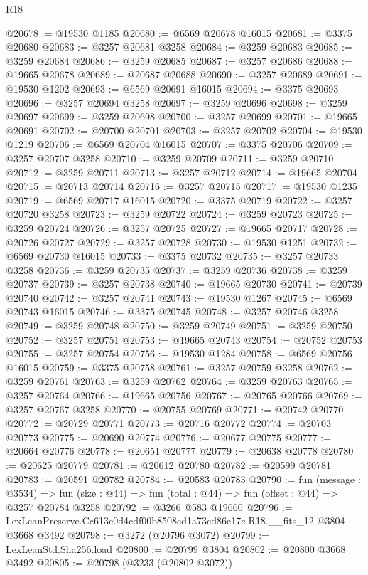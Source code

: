 \begin{lexlean}{R18}
\begin{coremodule}
@20678 := @19530 @1185
@20680 := @6569 @20678 @16015
@20681 := @3375 @20680
@20683 := @3257 @20681 @3258
@20684 := @3259 @20683
@20685 := @3259 @20684
@20686 := @3259 @20685
@20687 := @3257 @20686
@20688 := @19665 @20678
@20689 := @20687 @20688
@20690 := @3257 @20689
@20691 := @19530 @1202
@20693 := @6569 @20691 @16015
@20694 := @3375 @20693
@20696 := @3257 @20694 @3258
@20697 := @3259 @20696
@20698 := @3259 @20697
@20699 := @3259 @20698
@20700 := @3257 @20699
@20701 := @19665 @20691
@20702 := @20700 @20701
@20703 := @3257 @20702
@20704 := @19530 @1219
@20706 := @6569 @20704 @16015
@20707 := @3375 @20706
@20709 := @3257 @20707 @3258
@20710 := @3259 @20709
@20711 := @3259 @20710
@20712 := @3259 @20711
@20713 := @3257 @20712
@20714 := @19665 @20704
@20715 := @20713 @20714
@20716 := @3257 @20715
@20717 := @19530 @1235
@20719 := @6569 @20717 @16015
@20720 := @3375 @20719
@20722 := @3257 @20720 @3258
@20723 := @3259 @20722
@20724 := @3259 @20723
@20725 := @3259 @20724
@20726 := @3257 @20725
@20727 := @19665 @20717
@20728 := @20726 @20727
@20729 := @3257 @20728
@20730 := @19530 @1251
@20732 := @6569 @20730 @16015
@20733 := @3375 @20732
@20735 := @3257 @20733 @3258
@20736 := @3259 @20735
@20737 := @3259 @20736
@20738 := @3259 @20737
@20739 := @3257 @20738
@20740 := @19665 @20730
@20741 := @20739 @20740
@20742 := @3257 @20741
@20743 := @19530 @1267
@20745 := @6569 @20743 @16015
@20746 := @3375 @20745
@20748 := @3257 @20746 @3258
@20749 := @3259 @20748
@20750 := @3259 @20749
@20751 := @3259 @20750
@20752 := @3257 @20751
@20753 := @19665 @20743
@20754 := @20752 @20753
@20755 := @3257 @20754
@20756 := @19530 @1284
@20758 := @6569 @20756 @16015
@20759 := @3375 @20758
@20761 := @3257 @20759 @3258
@20762 := @3259 @20761
@20763 := @3259 @20762
@20764 := @3259 @20763
@20765 := @3257 @20764
@20766 := @19665 @20756
@20767 := @20765 @20766
@20769 := @3257 @20767 @3258
@20770 := @20755 @20769
@20771 := @20742 @20770
@20772 := @20729 @20771
@20773 := @20716 @20772
@20774 := @20703 @20773
@20775 := @20690 @20774
@20776 := @20677 @20775
@20777 := @20664 @20776
@20778 := @20651 @20777
@20779 := @20638 @20778
@20780 := @20625 @20779
@20781 := @20612 @20780
@20782 := @20599 @20781
@20783 := @20591 @20782
@20784 := @20583 @20783
@20790 := fun (message : @3534) =>
  fun (size : @44) => fun (total : @44) => fun (offset : @44) => @3257 @20784 @3258
@20792 := @3266 @583 @19660
@20796 := LexLeanPreserve.Cc613c0d4cdf00b8508ed1a73cd86e17c.R18.__fits_12 @3804 @3668 @3492
@20798 := @3272 (@20796 @3072)
@20799 := LexLeanStd.Sha256.load
@20800 := @20799 @3804
@20802 := @20800 @3668 @3492
@20805 := @20798 (@3233 (@20802 @3072))

\end{coremodule}
\end{lexlean}
